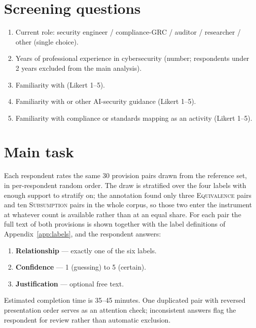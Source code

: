 \section{Screening questions}

\begin{enumerate}[label=S\arabic*.]
  \item Current role: security engineer / compliance-GRC / auditor /
  researcher / other (single choice).
  \item Years of professional experience in cybersecurity (number;
  respondents under 2 years excluded from the main analysis).
  \item Familiarity with \standardA{} (Likert 1--5).
  \item Familiarity with \standardB{} or other AI-security guidance
  (Likert 1--5).
  \item Familiarity with compliance or standards mapping as an activity
  (Likert 1--5).
\end{enumerate}

\section{Main task}

Each respondent rates the same 30 provision pairs drawn from the reference set,
in per-respondent random order. The draw is stratified over the four labels with
enough support to stratify on; the annotation found only three
\textsc{Equivalence} pairs and ten \textsc{Subsumption} pairs in the whole
corpus, so those two enter the instrument at whatever count is available rather
than at an equal share. For each pair the full
text of both provisions is shown together with the label definitions of
Appendix~\ref{app:labels}, and the respondent answers:

\begin{enumerate}[label=Q\arabic*.]
  \item \textbf{Relationship} --- exactly one of the six labels.
  \item \textbf{Confidence} --- 1 (guessing) to 5 (certain).
  \item \textbf{Justification} --- optional free text.
\end{enumerate}

Estimated completion time is 35--45 minutes. One duplicated pair with
reversed presentation order serves as an attention check; inconsistent
answers flag the respondent for review rather than automatic exclusion.

